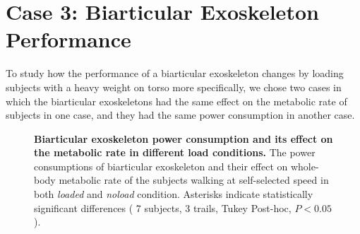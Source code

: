 \documentclass[10pt,letterpaper]{article}
\begin{document}
\section*{Case 3: Biarticular Exoskeleton Performance}
To study how the performance of a biarticular exoskeleton changes by loading subjects with a heavy weight on torso more specifically, we chose two cases in which the biarticular exoskeletons had the same effect on the metabolic rate of subjects in one case, and they had the same power consumption in another case.\\ 
\begin{figure}[th!]
	\centering
	\hfil
	\vspace{2mm}
	\caption{\small{\textbf{Biarticular exoskeleton power consumption and its effect on the metabolic rate in different load conditions.} The power consumptions of biarticular exoskeleton and their effect on whole-body metabolic rate of the subjects walking at self-selected speed in both {\it loaded} and {\it noload} condition. Asterisks indicate statistically significant differences ( 7 subjects, 3 trails, Tukey Post-hoc, $P < 0.05$).}}
	\label{Fig_Case03_Energy_Plot}
\end{figure}
\end{document}
